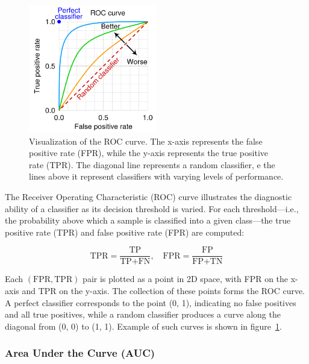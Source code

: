 \documentclass{pracalicmgr}
\begin{document}
\begin{figure}[H]
    \centering
    \includegraphics[width=0.5\textwidth]{src/roc-curveUp.jpg}
    \caption{Visualization of the ROC curve. The x-axis represents the false positive rate (FPR), while the y-axis represents the true positive rate (TPR). The diagonal line represents a random classifier, e the lines above it represent classifiers with varying levels of performance\cite{ROCEG}.}
    \label{fig:roc_curve}
\end{figure}

The Receiver Operating Characteristic (ROC) curve illustrates the diagnostic ability of a classifier as its decision threshold is varied\cite{GoogleDevelopersROCAUC}. For each threshold—i.e., the probability above which a sample is classified into a given class—the true positive rate (TPR) and false positive rate (FPR) are computed:

\[
\text{TPR} = \frac{\text{TP}}{\text{TP} + \text{FN}}, \quad
\text{FPR} = \frac{\text{FP}}{\text{FP} + \text{TN}}
\]

Each \((\text{FPR}, \text{TPR})\) pair is plotted as a point in 2D space, with FPR on the x-axis and TPR on the y-axis. The collection of these points forms the ROC curve. A perfect classifier corresponds to the point (0, 1), indicating no false positives and all true positives, while a random classifier produces a curve along the diagonal from (0, 0) to (1, 1). Example of such curves is shown in figure~\ref{fig:roc_curve}.


\subsubsection{Area Under the Curve (AUC)}
\end{document}
